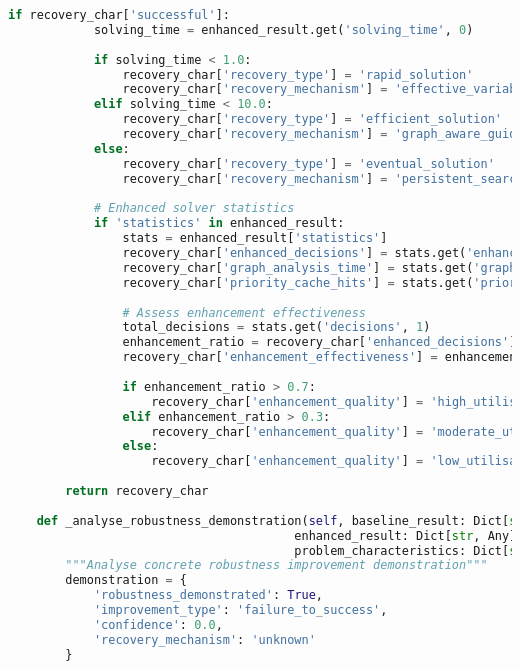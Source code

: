 \begin{lstlisting}[language=Python, caption=Systematic Failure Mode Analysis and Recovery Validation]
        if recovery_char['successful']:
            solving_time = enhanced_result.get('solving_time', 0)
            
            if solving_time < 1.0:
                recovery_char['recovery_type'] = 'rapid_solution'
                recovery_char['recovery_mechanism'] = 'effective_variable_ordering'
            elif solving_time < 10.0:
                recovery_char['recovery_type'] = 'efficient_solution'
                recovery_char['recovery_mechanism'] = 'graph_aware_guidance'
            else:
                recovery_char['recovery_type'] = 'eventual_solution'
                recovery_char['recovery_mechanism'] = 'persistent_search'
            
            # Enhanced solver statistics
            if 'statistics' in enhanced_result:
                stats = enhanced_result['statistics']
                recovery_char['enhanced_decisions'] = stats.get('enhanced_decisions', 0)
                recovery_char['graph_analysis_time'] = stats.get('graph_analysis_time', 0.0)
                recovery_char['priority_cache_hits'] = stats.get('priority_cache_hits', 0)
                
                # Assess enhancement effectiveness
                total_decisions = stats.get('decisions', 1)
                enhancement_ratio = recovery_char['enhanced_decisions'] / total_decisions
                recovery_char['enhancement_effectiveness'] = enhancement_ratio
                
                if enhancement_ratio > 0.7:
                    recovery_char['enhancement_quality'] = 'high_utilisation'
                elif enhancement_ratio > 0.3:
                    recovery_char['enhancement_quality'] = 'moderate_utilisation'
                else:
                    recovery_char['enhancement_quality'] = 'low_utilisation'
        
        return recovery_char
    
    def _analyse_robustness_demonstration(self, baseline_result: Dict[str, Any],
                                        enhanced_result: Dict[str, Any],
                                        problem_characteristics: Dict[str, Any]) -> Dict[str, Any]:
        """Analyse concrete robustness improvement demonstration"""
        demonstration = {
            'robustness_demonstrated': True,
            'improvement_type': 'failure_to_success',
            'confidence': 0.0,
            'recovery_mechanism': 'unknown'
        }
        

\end{lstlisting}
